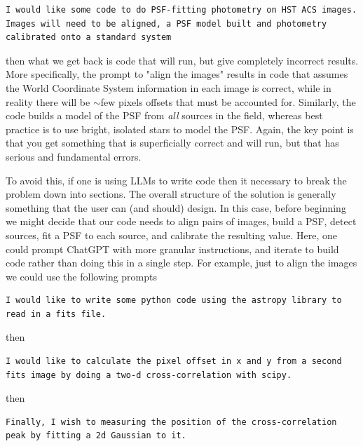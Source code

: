 \documentclass{tufte-book}
\begin{document}
\begin{lstlisting}[backgroundcolor=\color{lightgray}, breaklines=true]
I would like some code to do PSF-fitting photometry on HST ACS images. Images will need to be aligned, a PSF model built and photometry calibrated onto a standard system
\end{lstlisting}

\noindent then what we get back is code that will run, but give completely incorrect results. More specifically, the prompt to "align the images" results in code that assumes the World Coordinate System information in each image is correct, while in reality there will be $\sim$few pixels offsets that must be accounted for. Similarly, the code builds a model of the PSF from {\it all} sources in the field, whereas best practice is to use bright, isolated stars to model the PSF. Again, the key point is that you get something that is superficially correct and will run, but that has serious and fundamental errors.

To avoid this, if one is using LLMs to write code then it necessary to break the problem down into sections. The overall structure of the solution is generally something that the user can (and should) design. In this case, before beginning we might decide that our code needs to align pairs of images, build a PSF, detect sources, fit a PSF to each source, and calibrate the resulting value. Here, one could prompt ChatGPT with more granular instructions, and iterate to build code rather than doing this in a single step. For example, just to align the images we could use the following prompts

\begin{lstlisting}[backgroundcolor=\color{lightgray},breaklines=true]
I would like to write some python code using the astropy library to read in a fits file.
\end{lstlisting}

then

\begin{lstlisting}[backgroundcolor=\color{lightgray}, breaklines=true]
I would like to calculate the pixel offset in x and y from a second fits image by doing a two-d cross-correlation with scipy.
\end{lstlisting}

then 

\begin{lstlisting}[backgroundcolor=\color{lightgray}, breaklines=true]
Finally, I wish to measuring the position of the cross-correlation peak by fitting a 2d Gaussian to it.
\end{lstlisting}
\end{document}
